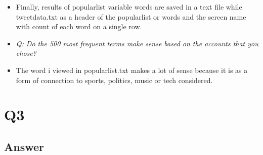 \documentclass[12pt]{article}
\begin{document}
\begin{itemize}
\item Finally, results of popularlist variable words are saved in a text file while tweetdata.txt as a header of the popularlist or words and the screen name with count of each word on a single row.

\item \emph{Q: Do the 500 most frequent terms make sense based on the accounts that you chose?}

\item The word i viewed in popularlist.txt makes a lot of sense because it is as a form of connection to sports, politics, music or tech considered.


\end{itemize}

\section*{Q3}

\subsection*{Answer}
\end{document}
